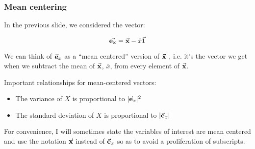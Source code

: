 \documentclass{beamer}
\begin{document}
\begin{frame}
  \frametitle{Mean centering}

In the previous slide, we considered the vector: 

\[
\vec{\mathbf{e_x}} = \vec{\mathbf{x}} - \bar{x}\vec{\mathbf{1}}
\]

\smallskip

We can think of $\vec{\mathbf{e}}_x$ as a ``mean centered'' version of $\vec{\mathbf{x}}$ , i.e. it's the vector we get when we subtract the mean of $\vec{\mathbf{x}}$, $\bar{x}$, from every element of $\vec{\mathbf{x}}$.

\medskip

Important relationships for mean-centered vectors:

\begin{itemize}
  \item The variance of $X$ is proportional to  $|\vec{\mathbf{e}}_x|^2$  
  \item The standard deviation of $X$ is proportional to  $|\vec{\mathbf{e}}_x|$
\end{itemize}

\medskip

{\small
For convenience, I will sometimes state the variables of interest are mean centered and use the notation $\vec{\mathbf{x}}$ instead of $\vec{\mathbf{e}}_x$ so as to avoid a proliferation of subscripts.
}


\end{frame}
\end{document}
